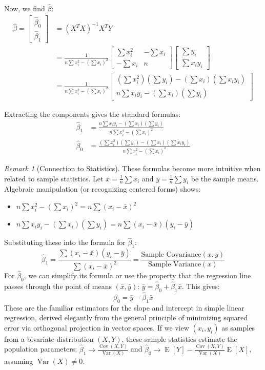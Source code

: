 \documentclass[11pt]{article}
\theoremstyle{definition}
\theoremstyle{remark}
\newtheorem{remark}[theorem]{Remark}
\DeclareMathOperator{\Var}{Var} %
\DeclareMathOperator{\Cov}{Cov} %
\DeclareMathOperator{\E}{E} %
\begin{document}
Now, we find $\hat{\beta}$:
\begin{align*}
\hat{\beta} = \begin{bmatrix} \hat{\beta}_0 \\ \hat{\beta}_1 \end{bmatrix} &= (X^T X)^{-1} X^T Y \\
&= \frac{1}{n \sum x_i^2 - (\sum x_i)^2} \begin{bmatrix} \sum x_i^2 & -\sum x_i \\ -\sum x_i & n \end{bmatrix} \begin{bmatrix} \sum y_i \\ \sum x_i y_i \end{bmatrix} \\
&= \frac{1}{n \sum x_i^2 - (\sum x_i)^2} \begin{bmatrix} (\sum x_i^2)(\sum y_i) - (\sum x_i)(\sum x_i y_i) \\ n \sum x_i y_i - (\sum x_i)(\sum y_i) \end{bmatrix}
\end{align*}

Extracting the components gives the standard formulas:
\begin{align*}
\hat{\beta}_1 &= \frac{n \sum x_i y_i - (\sum x_i)(\sum y_i)}{n \sum x_i^2 - (\sum x_i)^2} \\
\hat{\beta}_0 &= \frac{(\sum x_i^2)(\sum y_i) - (\sum x_i)(\sum x_i y_i)}{n \sum x_i^2 - (\sum x_i)^2}
\end{align*}

\begin{remark}[Connection to Statistics]
These formulas become more intuitive when related to sample statistics. Let $\bar{x} = \frac{1}{n}\sum x_i$ and $\bar{y} = \frac{1}{n}\sum y_i$ be the sample means. Algebraic manipulation (or recognizing centered forms) shows:
\begin{itemize}
    \item $n \sum x_i^2 - (\sum x_i)^2 = n \sum (x_i - \bar{x})^2$
    \item $n \sum x_i y_i - (\sum x_i)(\sum y_i) = n \sum (x_i - \bar{x})(y_i - \bar{y})$
\end{itemize}
Substituting these into the formula for $\hat{\beta}_1$:
\[
\hat{\beta}_1 = \frac{\sum (x_i - \bar{x})(y_i - \bar{y})}{\sum (x_i - \bar{x})^2} = \frac{\text{Sample Covariance}(x, y)}{\text{Sample Variance}(x)}
\]
For $\hat{\beta}_0$, we can simplify its formula or use the property that the regression line passes through the point of means $(\bar{x}, \bar{y})$: $\bar{y} = \hat{\beta}_0 + \hat{\beta}_1 \bar{x}$. This gives:
\[
\hat{\beta}_0 = \bar{y} - \hat{\beta}_1 \bar{x}
\]
These are the familiar estimators for the slope and intercept in simple linear regression, derived elegantly from the general principle of minimizing squared error via orthogonal projection in vector spaces. If we view $(x_i, y_i)$ as samples from a bivariate distribution $(X, Y)$, these sample statistics estimate the population parameters: $\hat{\beta}_1 \to \frac{\Cov(X, Y)}{\Var(X)}$ and $\hat{\beta}_0 \to \E[Y] - \frac{\Cov(X, Y)}{\Var(X)} \E[X]$, assuming $\Var(X) \neq 0$.
\end{remark}
\end{document}
